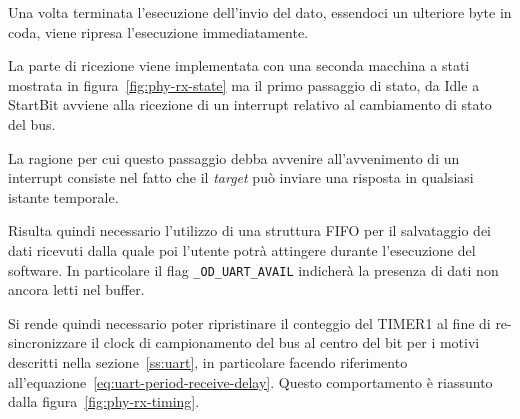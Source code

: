 Una volta terminata l'esecuzione dell'invio del dato, essendoci un ulteriore byte in coda, viene ripresa l'esecuzione immediatamente.

\begin{figure}[p]
    \checkoddpage%
    \ifoddpage%
    \else
    \fi
\end{figure}



La parte di ricezione viene implementata con una seconda macchina a stati mostrata in figura~\ref{fig:phy-rx-state} ma il primo passaggio di stato, da Idle a StartBit avviene alla ricezione di un interrupt relativo al cambiamento di stato del bus.

La ragione per cui questo passaggio debba avvenire all'avvenimento di un interrupt consiste nel fatto che il \textit{target} può inviare una risposta in qualsiasi istante temporale.

Risulta quindi necessario l'utilizzo di una struttura FIFO per il salvataggio dei dati ricevuti dalla quale poi l'utente potrà attingere durante l'esecuzione del software. In particolare il flag \texttt{\_OD\_UART\_AVAIL} indicherà la presenza di dati non ancora letti nel buffer.

Si rende quindi necessario poter ripristinare il conteggio del TIMER1 al fine di re-sincronizzare il clock di campionamento del bus al centro del bit per i motivi descritti nella sezione~\ref{ss:uart}, in particolare facendo riferimento all'equazione~\ref{eq:uart-period-receive-delay}. Questo comportamento è riassunto dalla figura~\ref{fig:phy-rx-timing}.

